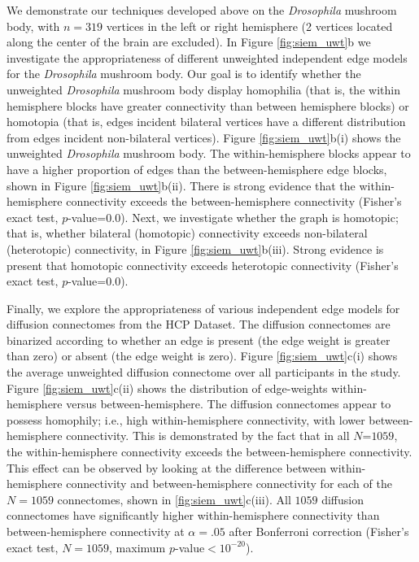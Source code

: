 We demonstrate our techniques developed above on the \textit{Drosophila} mushroom body, with $n=319$ vertices in the left or right hemisphere (2 vertices located along the center of the brain are excluded). In Figure \ref{fig:siem_uwt}b we investigate the appropriateness of different unweighted independent edge models for the \textit{Drosophila} mushroom body. Our goal is to identify whether the unweighted \textit{Drosophila} mushroom body display homophilia (that is, the within hemisphere blocks have greater connectivity than between hemisphere blocks) or homotopia (that is, edges incident bilateral vertices have a different distribution from edges incident non-bilateral vertices). Figure \ref{fig:siem_uwt}b(i) shows the unweighted \textit{Drosophila} mushroom body. The within-hemisphere blocks appear to have a higher proportion of edges than the between-hemisphere edge blocks, shown in Figure \ref{fig:siem_uwt}b(ii). There is strong evidence that the within-hemisphere connectivity exceeds the between-hemisphere connectivity (Fisher's exact test, $p$-value=$0.0$). Next, we investigate whether the graph is homotopic; that is, whether bilateral (homotopic) connectivity exceeds non-bilateral (heterotopic) connectivity, in Figure \ref{fig:siem_uwt}b(iii). Strong evidence is present that homotopic connectivity exceeds heterotopic connectivity (Fisher's exact test, $p$-value=$0.0$).

Finally, we explore the appropriateness of various independent edge models for diffusion connectomes from the HCP Dataset. The diffusion connectomes are binarized according to whether an edge is present (the edge weight is greater than zero) or absent (the edge weight is zero). Figure \ref{fig:siem_uwt}c(i) shows the average unweighted diffusion connectome over all participants in the study. Figure \ref{fig:siem_uwt}c(ii) shows the distribution of edge-weights within-hemisphere versus between-hemisphere. The diffusion connectomes appear to possess homophily; i.e., high within-hemisphere connectivity, with lower between-hemisphere connectivity. This is demonstrated by the fact that in all $N$=$1059$, the within-hemisphere connectivity exceeds the between-hemisphere connectivity. This effect can be observed by looking at the difference between within-hemisphere connectivity and between-hemisphere connectivity for each of the $N=1059$ connectomes, shown in \ref{fig:siem_uwt}c(iii). All $1059$ diffusion connectomes have significantly higher within-hemisphere connectivity than between-hemisphere connectivity at $\alpha=.05$ after Bonferroni correction (Fisher's exact test, $N=1059$, maximum $p$-value$<10^{-20}$).

